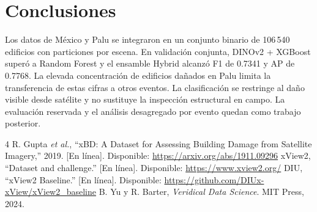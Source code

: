 \documentclass[conference]{IEEEtran}
\begin{document}
\section{Conclusiones}
Los datos de México y Palu se integraron en un conjunto binario de 106\,540 edificios con particiones por escena. En validación conjunta, DINOv2 + XGBoost superó a Random Forest y el ensamble Hybrid alcanzó F1 de 0.7341 y AP de 0.7768. La elevada concentración de edificios dañados en Palu limita la transferencia de estas cifras a otros eventos. La clasificación se restringe al daño visible desde satélite y no sustituye la inspección estructural en campo. La evaluación reservada y el análisis desagregado por evento quedan como trabajo posterior.
\begin{thebibliography}{4}
 R. Gupta \emph{et al.}, ``xBD: A Dataset for Assessing Building Damage from Satellite Imagery,'' 2019. [En línea]. Disponible: \url{https://arxiv.org/abs/1911.09296}
 xView2, ``Dataset and challenge.'' [En línea]. Disponible: \url{https://www.xview2.org/}
 DIU, ``xView2 Baseline.'' [En línea]. Disponible: \url{https://github.com/DIUx-xView/xView2_baseline}
 B. Yu y R. Barter, \emph{Veridical Data Science}. MIT Press, 2024.
\end{thebibliography}
\end{document}

